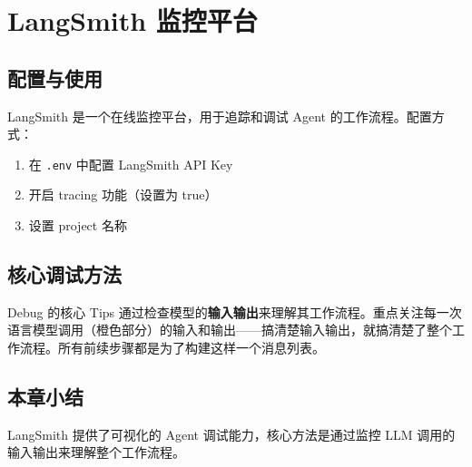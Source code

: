 \section{LangSmith 监控平台}

\subsection{配置与使用}

LangSmith 是一个在线监控平台，用于追踪和调试 Agent 的工作流程。配置方式：
\begin{enumerate}
    \item 在 \texttt{.env} 中配置 LangSmith API Key
    \item 开启 tracing 功能（设置为 true）
    \item 设置 project 名称
\end{enumerate}

\subsection{核心调试方法}

\begin{importantbox}{Debug 的核心 Tips}
通过检查模型的\textbf{输入输出}来理解其工作流程。重点关注每一次语言模型调用（橙色部分）的输入和输出——搞清楚输入输出，就搞清楚了整个工作流程。所有前续步骤都是为了构建这样一个消息列表。
\end{importantbox}

\subsection{本章小结}
LangSmith 提供了可视化的 Agent 调试能力，核心方法是通过监控 LLM 调用的输入输出来理解整个工作流程。

